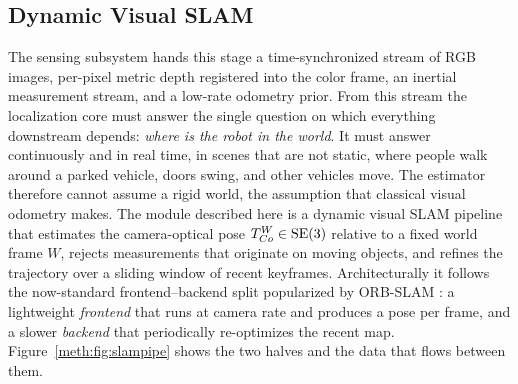 \subsection{Dynamic Visual SLAM}\label{meth:sec:slam}

The sensing subsystem hands this stage a time-synchronized stream of RGB images, per-pixel metric depth registered into the color frame, an inertial measurement stream, and a low-rate odometry prior. From this stream the localization core must answer the single question on which everything downstream depends: \emph{where is the robot in the world}. It must answer continuously and in real time, in scenes that are not static, where people walk around a parked vehicle, doors swing, and other vehicles move. The estimator therefore cannot assume a rigid world, the assumption that classical visual odometry makes. The module described here is a dynamic visual SLAM pipeline that estimates the camera-optical pose $T^{W}_{Co}\in\mathrm{SE}(3)$ relative to a fixed world frame $W$, rejects measurements that originate on moving objects, and refines the trajectory over a sliding window of recent keyframes. Architecturally it follows the now-standard frontend--backend split popularized by ORB-SLAM \cite{murartal_2015_orbslam,campos_2021_orbslam3}: a lightweight \emph{frontend} that runs at camera rate and produces a pose per frame, and a slower \emph{backend} that periodically re-optimizes the recent map. Figure~\ref{meth:fig:slampipe} shows the two halves and the data that flows between them.

